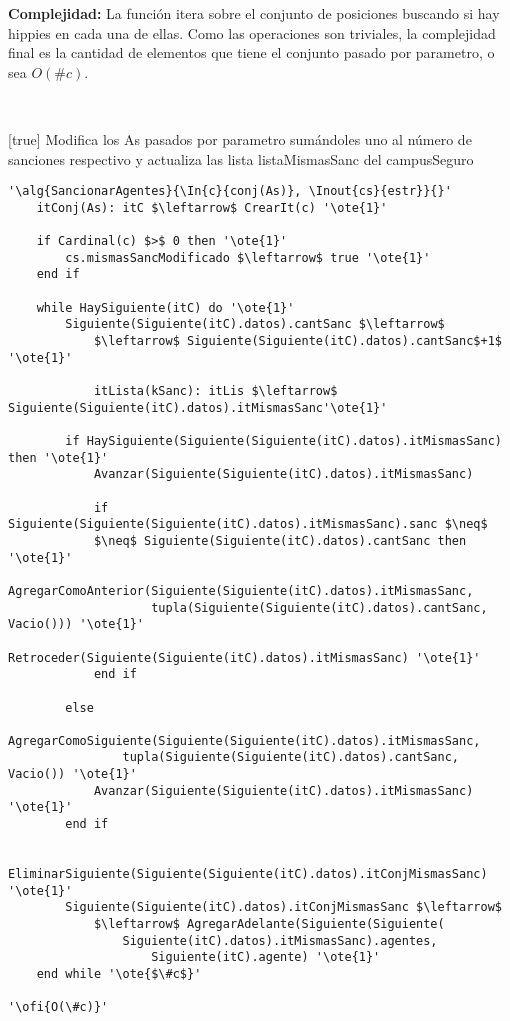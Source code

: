 \textbf{Complejidad:} La función itera sobre el conjunto de posiciones buscando si hay hippies en cada una de ellas. Como las operaciones son triviales, la complejidad final es la cantidad de elementos que tiene el conjunto pasado por parametro, o sea $O(\#c)$.

~


[true]
{Modifica los As pasados por parametro sumándoles uno al número de sanciones respectivo y actualiza las lista listaMismasSanc del campusSeguro}

\begin{lstlisting}[mathescape]
'\alg{SancionarAgentes}{\In{c}{conj(As)}, \Inout{cs}{estr}}{}'
	itConj(As): itC $\leftarrow$ CrearIt(c) '\ote{1}'

	if Cardinal(c) $>$ 0 then '\ote{1}'
		cs.mismasSancModificado $\leftarrow$ true '\ote{1}'
	end if

	while HaySiguiente(itC) do '\ote{1}'
		Siguiente(Siguiente(itC).datos).cantSanc $\leftarrow$
			$\leftarrow$ Siguiente(Siguiente(itC).datos).cantSanc$+1$ '\ote{1}'

			itLista(kSanc): itLis $\leftarrow$ Siguiente(Siguiente(itC).datos).itMismasSanc'\ote{1}'

		if HaySiguiente(Siguiente(Siguiente(itC).datos).itMismasSanc) then '\ote{1}'
			Avanzar(Siguiente(Siguiente(itC).datos).itMismasSanc)

			if Siguiente(Siguiente(Siguiente(itC).datos).itMismasSanc).sanc $\neq$
			$\neq$ Siguiente(Siguiente(itC).datos).cantSanc then '\ote{1}'
				AgregarComoAnterior(Siguiente(Siguiente(itC).datos).itMismasSanc,
					tupla(Siguiente(Siguiente(itC).datos).cantSanc, Vacio())) '\ote{1}'
				Retroceder(Siguiente(Siguiente(itC).datos).itMismasSanc) '\ote{1}'
			end if

		else
			AgregarComoSiguiente(Siguiente(Siguiente(itC).datos).itMismasSanc,
				tupla(Siguiente(Siguiente(itC).datos).cantSanc, Vacio()) '\ote{1}'
			Avanzar(Siguiente(Siguiente(itC).datos).itMismasSanc) '\ote{1}'
		end if

		EliminarSiguiente(Siguiente(Siguiente(itC).datos).itConjMismasSanc) '\ote{1}'
		Siguiente(Siguiente(itC).datos).itConjMismasSanc $\leftarrow$
			$\leftarrow$ AgregarAdelante(Siguiente(Siguiente(
				Siguiente(itC).datos).itMismasSanc).agentes,
					Siguiente(itC).agente) '\ote{1}'
	end while '\ote{$\#c$}'

'\ofi{O(\#c)}'
\end{lstlisting}

